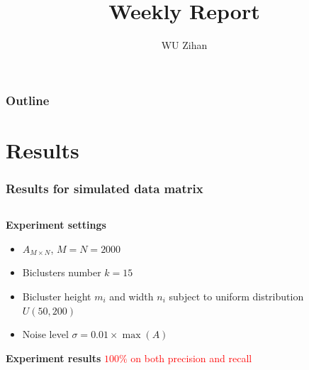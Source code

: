 \documentclass{beamer}
\title{Weekly Report}
\author{WU Zihan}
\begin{document}
\maketitle
\begin{frame}
    \frametitle{Outline}
    \tableofcontents
\end{frame}

\section{Results}
\begin{frame}
    \frametitle{Results for simulated data matrix}
    \begin{columns}[T]
        \begin{column}{0.5\textwidth}
            \centering
            \textbf{Experiment settings}
            \begin{itemize}
                \item $A_{M\times N}$, $M = N = 2000$
                \item Biclusters number $k = 15$
                \item Bicluster height $m_i$ and width $n_i$ subject to uniform distribution $U(50, 200)$
                \item Noise level $\sigma = 0.01 \times \max(A)$
            \end{itemize}
            \textbf{Experiment results}
    \textcolor{red}{$100\%$ on both precision and recall}
        \end{column}
        \begin{column}{0.5\textwidth}
            \vspace{-1cm}
            \centering
            

\end{column}
\end{columns}
\end{frame}
\end{document}
